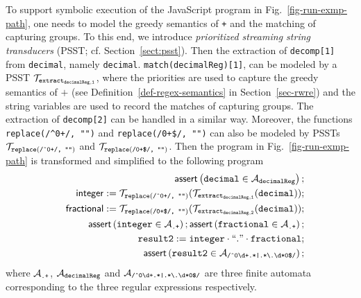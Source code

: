 To support symbolic execution of the JavaScript program in Fig.~\ref{fig-run-exmp-path}, one needs to model the greedy semantics of {\tt +} and the matching of capturing groups. To this end, we introduce \emph{prioritized streaming string transducers} (PSST; cf. Section~\ref{sect:psst}). Then the extraction of {\tt decomp[1]} from {\tt decimal}, namely {\tt decimal}. {\tt match(decimalReg)[1]}, can be modeled by a PSST $\mathcal{T}_{\tt extract_{decimalReg,1}}$, where the priorities are used to capture the greedy semantics of $+$ (see Definition~\ref{def-regex-semantics} in Section~\ref{sec-rwre}) and the string variables are used to record the matches of capturing groups. %
The extraction of {\tt decomp[2]} can be handled in a similar way. Moreover, the functions {\tt replace(/\^{}0+/, "")} and {\tt replace(/0+\$/, "")}  can also be modeled by PSSTs $\mathcal{T}_{\scriptsize\tt replace(\mbox{\tt /\^{}0+/, ""})}$ and $\mathcal{T}_{\scriptsize\tt replace(\mbox{\tt /0+\$/, ""})}$. Then the program in Fig.~\ref{fig-run-exmp-path} is transformed and simplified to the following program
\begin{eqnarray}\label{eqn:exmp}
& & \textsf{assert}\left(\tt decimal \in \mathcal{A}_{decimalReg}\right);\nonumber \\
& & \sf integer  := \tt  \mathcal{T}_{\tt replace(\mbox{\scriptsize \tt /\^{}0+/, ""})}(\mathcal{T}_{\tt extract_{decimalReg,1}}(decimal));\nonumber \\
& & \sf fractional  := \tt  \mathcal{T}_{\scriptsize\tt replace(\mbox{\tt /0+\$/, ""})}(\mathcal{T}_{\tt extract_{decimalReg,2}}(decimal));\nonumber \\
&&  \textsf{assert}\left(\tt integer \in \mathcal{A}_{\scriptsize\mbox{\tt.+}}\right); 
\textsf{assert}\left(\tt fractional \in \mathcal{A}_{\scriptsize\mbox{\tt.+}}\right); \nonumber\\
 && \tt result2 := integer \cdot ``." \cdot fractional; \nonumber\\
 && \textsf{assert}\left(\tt result2 \in \mathcal{A}_{\scriptsize\mbox{\tt /\^{}0\textbackslash d+.*|.*{\scriptsize\textbackslash}.\textbackslash d*0\$/}}\right); 
\end{eqnarray}
where $\mathcal{A}_{\scriptsize\mbox{\tt.+}}$, $\mathcal{A}_{\tt decimalReg}$ and $\mathcal{A}_{\scriptsize\mbox{\tt /\^{}0\textbackslash d+.*|.*{\scriptsize\textbackslash}.\textbackslash d*0\$/}}$ are three finite automata corresponding to the three regular expressions respectively.

